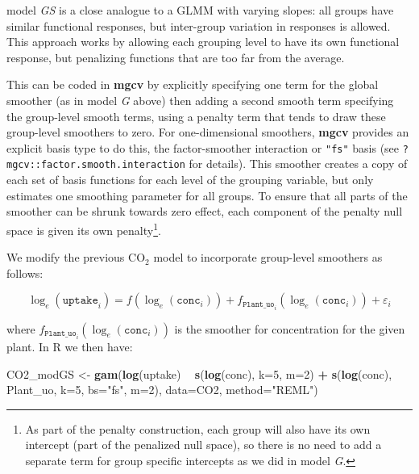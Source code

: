 \documentclass[12pt]{article}
\newenvironment{Shaded}{\begin{snugshade}}{\end{snugshade}}
\newcommand{\KeywordTok}[1]{\textcolor[rgb]{0.13,0.29,0.53}{\textbf{#1}}}
\newcommand{\DataTypeTok}[1]{\textcolor[rgb]{0.13,0.29,0.53}{#1}}
\newcommand{\DecValTok}[1]{\textcolor[rgb]{0.00,0.00,0.81}{#1}}
\newcommand{\StringTok}[1]{\textcolor[rgb]{0.31,0.60,0.02}{#1}}
\newcommand{\OperatorTok}[1]{\textcolor[rgb]{0.81,0.36,0.00}{\textbf{#1}}}
\newcommand{\NormalTok}[1]{#1}
\let\rmarkdownfootnote\footnote%
\def\footnote{\protect\rmarkdownfootnote}
\begin{document}
model \emph{GS} is a close analogue to a GLMM with varying slopes: all
groups have similar functional responses, but inter-group variation in
responses is allowed. This approach works by allowing each grouping
level to have its own functional response, but penalizing functions that
are too far from the average.

This can be coded in \textbf{mgcv} by explicitly specifying one term for
the global smoother (as in model \emph{G} above) then adding a second
smooth term specifying the group-level smooth terms, using a penalty
term that tends to draw these group-level smoothers to zero. For
one-dimensional smoothers, \textbf{mgcv} provides an explicit basis type
to do this, the factor-smoother interaction or \texttt{"fs"} basis (see
\texttt{?mgcv::factor.smooth.interaction} for details). This smoother
creates a copy of each set of basis functions for each level of the
grouping variable, but only estimates one smoothing parameter for all
groups. To ensure that all parts of the smoother can be shrunk towards
zero effect, each component of the penalty null space is given its own
penalty\footnote{As part of the penalty construction, each group will
  also have its own intercept (part of the penalized null space), so
  there is no need to add a separate term for group specific intercepts
  as we did in model \emph{G}.}.

We modify the previous \(\text{CO}_2\) model to incorporate group-level
smoothers as follows:

\[
\log_e(\texttt{uptake}_i) = f(\log_e(\texttt{conc}_i)) + f_{\texttt{Plant\_uo}_i}(\log_e(\texttt{conc}_i)) + \varepsilon_i
\]

where \(f_{\texttt{Plant\_uo}_i}(\log_e(\texttt{conc}_i))\) is the
smoother for concentration for the given plant. In R we then have:

\begin{Shaded}
\begin{Highlighting}[]
\NormalTok{CO2_modGS <-}\StringTok{ }\KeywordTok{gam}\NormalTok{(}\KeywordTok{log}\NormalTok{(uptake) }\OperatorTok{~}\StringTok{ }\KeywordTok{s}\NormalTok{(}\KeywordTok{log}\NormalTok{(conc), }\DataTypeTok{k=}\DecValTok{5}\NormalTok{, }\DataTypeTok{m=}\DecValTok{2}\NormalTok{) }\OperatorTok{+}\StringTok{ }
\StringTok{                  }\KeywordTok{s}\NormalTok{(}\KeywordTok{log}\NormalTok{(conc), Plant_uo, }\DataTypeTok{k=}\DecValTok{5}\NormalTok{,  }\DataTypeTok{bs=}\StringTok{"fs"}\NormalTok{, }\DataTypeTok{m=}\DecValTok{2}\NormalTok{),}
                \DataTypeTok{data=}\NormalTok{CO2, }\DataTypeTok{method=}\StringTok{"REML"}\NormalTok{)}
\end{Highlighting}
\end{Shaded}
\end{document}
